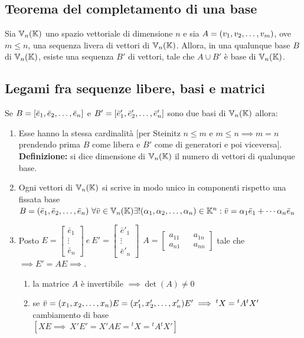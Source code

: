 \documentclass[../main.tex]{subfiles}
\begin{document}
\subsection{Teorema del completamento di una base}
Sia $\mathbb{V}_n (\mathbb{K})$ uno spazio vettoriale di dimensione $n$ e sia $A = (v_1, v_2, \ldots, v_{m})$,
ove $m\leq n$, una sequenza livera di vettori di $\mathbb{V}_n (\mathbb{K})$. Allora, in una
qualunque base $B$ di $\mathbb{V}_n (\mathbb{K})$, esiste una sequenza $B'$ di vettori, tale che
$A\cup B'$ è base di $\mathbb{V}_n (\mathbb{K})$.

\subsection{Legami fra sequenze libere, basi e matrici}
Se $B=[\bar{e}_1, \bar{e}_2, \ldots, \bar{e}_{n}]$ e $B'=[\bar{e}'_1, \bar{e}'_2, \ldots, \bar{e}'_{n}]$ sono due basi di $\mathbb{V}_n (\mathbb{K})$
allora:
\begin{enumerate}
    \item Esse hanno la stessa cardinalità [per Steinitz $n\leq m$ e $m\leq n \implies m
              = n$ prendendo prima $B$ come libera e $B'$ come di generatori e poi
          viceversa].\\ \textbf{Definizione:} si dice dimensione di $\mathbb{V}_n (\mathbb{K})$ il numero di
          vettori di qualunque base.
    \item Ogni vettori di $\mathbb{V}_n (\mathbb{K})$ si scrive in modo unico in componenti rispetto una
          fissata base \\ $B=(\bar e_1, \bar e_2, \ldots, \bar e_{n})\ \forall\bar v\in \mathbb{V}_n (\mathbb{K})\exists
              !(\alpha_1, \alpha_2, \ldots, \alpha_{n})\in\mathbb{K}^n:\bar v = \alpha_1\bar e_1+\cdots\alpha_n\bar e_n$
    \item Posto $ E = \begin{bmatrix}\bar e_1 \\ \vdots \\ \bar e_n\end{bmatrix} \ e \ E'=\begin{bmatrix}\bar e'_1 \\ \vdots \\ \bar e'_n\end{bmatrix} \ \ A=\begin{bmatrix}a_{11} && a_{1n} \\ a_{n1} && a_{nn} \end{bmatrix}$ tale che $\implies E'=AE\implies$.
          \begin{enumerate}
              \item la matrice $A$ è invertibile $\implies \det(A)\ne0$
              \item se $\bar v=(x_1, x_2, \ldots, x_{n})E=(x'_1, x'_2, \ldots, x'_{n})E'\implies {^{t}X} = {^{t}A}{^{t}X'}$
                    cambiamento di base \\$[XE\implies\ X'E'=X'AE={^{t}X}={^{t}A}{^{t}X'}]$
          \end{enumerate}
\end{enumerate}
\end{document}
